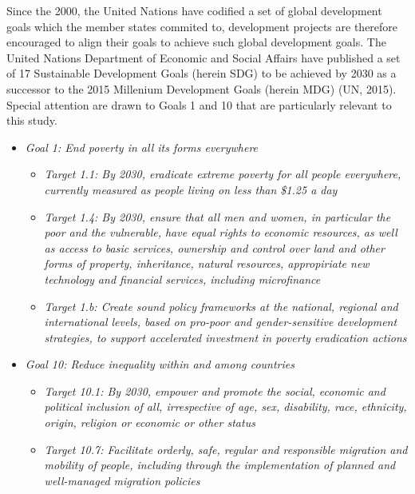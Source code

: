 \documentclass[11pt, a4paper, twoside]{report}
\begin{document}
Since the 2000, the United Nations have codified a set of global development goals which the member states commited to, development projects are therefore encouraged to align their goals to achieve such global development goals. The United Nations Department of Economic and Social Affairs have published a set of 17 Sustainable Development Goals (herein SDG) to be achieved by 2030 as a successor to the 2015 Millenium Development Goals (herein MDG) (UN, 2015). Special attention are drawn to Goals 1 and 10 that are particularly relevant to this study.\\\par

\begin{itemize}
  \item \textit{Goal 1: End poverty in all its forms everywhere}
  \begin{itemize}
    \item \textit{Target 1.1: By 2030, eradicate extreme poverty for all people everywhere, currently measured as people living on less than \$1.25 a day}
    \item \textit{Target 1.4: By 2030, ensure that all men and women, in particular the poor and the vulnerable, have equal rights to economic resources, as well as access to basic services, ownership and control over land and other forms of property, inheritance, natural resources, appropiriate new technology and financial services, including microfinance}
    \item \textit{Target 1.b: Create sound policy frameworks at the national, regional and international levels, based on pro-poor and gender-sensitive development strategies, to support accelerated investment in poverty eradication actions}
  \end{itemize}
  \item \textit{Goal 10: Reduce inequality within and among countries}
  \begin{itemize}
    \item \textit{Target 10.1: By 2030, empower and promote the social, economic and political inclusion of all, irrespective of age, sex, disability, race, ethnicity, origin, religion or economic or other status}
    \item \textit{Target 10.7: Facilitate orderly, safe, regular and responsible migration and mobility of people, including through the implementation of planned and well-managed migration policies}
  \end{itemize}
\end{itemize}
\end{document}
